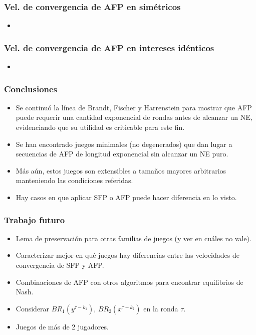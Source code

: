 \documentclass[handout, pdf]{beamer}
\begin{document}
\begin{frame}
    \frametitle{Vel. de convergencia de AFP en simétricos}
        \begin{itemize}
        \item 
        \end{itemize}
\end{frame}

\begin{frame}
    \frametitle{Vel. de convergencia de AFP en intereses idénticos}
        \begin{itemize}
        \item 
        \end{itemize}
\end{frame}

\begin{frame}
    \frametitle{Conclusiones}
        \begin{itemize}
        \item Se continuó la línea de Brandt, Fischer y Harrenstein para mostrar que AFP puede requerir una cantidad exponencial de rondas antes de alcanzar un NE, evidenciando que su utilidad es criticable para este fin.
        \item Se han encontrado juegos minimales (no degenerados) que dan lugar a secuencias de AFP de longitud exponencial sin alcanzar un NE puro.
        \item Más aún, estos juegos son extensibles a tamaños mayores arbitrarios manteniendo las condiciones referidas.
        \item Hay casos en que aplicar SFP o AFP puede hacer diferencia en lo visto.
        \end{itemize}
\end{frame}

\begin{frame}
    \frametitle{Trabajo futuro}
        \begin{itemize}
        \item Lema de preservación para otras familias de juegos (y ver en cuáles no vale).
        \item Caracterizar mejor en qué juegos hay diferencias entre las velocidades de convergencia de SFP y AFP. 
        \item Combinaciones de AFP con otros algoritmos para encontrar equilibrios de Nash.
        \item Considerar $BR_1(y^{\tau-k_1})$, $BR_2(x^{\tau-k_2})$ en la ronda $\tau$.
        \item Juegos de más de 2 jugadores.
        \end{itemize}
\end{frame}
\end{document}

